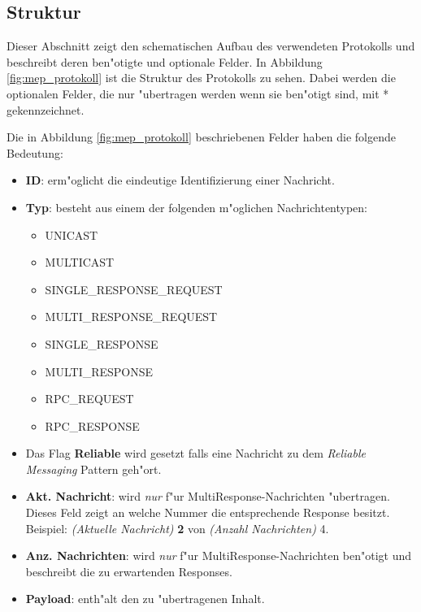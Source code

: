 \subsection{Struktur}
Dieser Abschnitt zeigt den schematischen Aufbau des verwendeten Protokolls und beschreibt deren ben"otigte und optionale Felder. In Abbildung \ref{fig:mep_protokoll} ist die Struktur des Protokolls zu sehen. Dabei werden die optionalen Felder, die nur "ubertragen werden wenn sie ben"otigt sind, mit * gekennzeichnet.

Die in Abbildung \ref{fig:mep_protokoll} beschriebenen Felder haben die folgende Bedeutung: 

\begin{itemize}
\item {\bf ID}: erm"oglicht die eindeutige Identifizierung einer Nachricht.
\item {\bf Typ}: besteht aus einem der folgenden m"oglichen Nachrichtentypen:
\begin{itemize}
\item UNICAST
\item MULTICAST
\item SINGLE\_RESPONSE\_REQUEST
\item MULTI\_RESPONSE\_REQUEST
\item SINGLE\_RESPONSE
\item MULTI\_RESPONSE
\item RPC\_REQUEST
\item RPC\_RESPONSE
\end{itemize}
\item Das Flag {\bf Reliable} wird gesetzt falls eine Nachricht zu dem \emph{Reliable Messaging} Pattern geh"ort.
\item {\bf Akt. Nachricht}: wird \emph{nur} f"ur MultiResponse-Nachrichten "ubertragen. Dieses Feld zeigt an welche Nummer die entsprechende Response besitzt. Beispiel: \emph{(Aktuelle Nachricht)} {\bf 2} von \emph{(Anzahl Nachrichten)} 4.
\item {\bf Anz. Nachrichten}: wird \emph{nur} f"ur MultiResponse-Nachrichten ben"otigt und beschreibt die zu erwartenden Responses. 
\item {\bf Payload}: enth"alt den zu "ubertragenen Inhalt.
\end{itemize}

